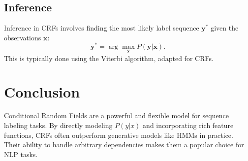 \begin{notechapter}
\subsection{Inference}
Inference in CRFs involves finding the most likely 
label sequence \( \mathbf{y}^* \) given the 
observations \( \mathbf{x} \):
\[
\mathbf{y}^* = \arg\max_{\mathbf{y}} P(\mathbf{y} | \mathbf{x}).
\]
This is typically done using the Viterbi algorithm, 
adapted for CRFs.

\section{Conclusion}
Conditional Random Fields are a powerful and flexible 
model for sequence labeling tasks. By directly modeling 
\( P(y | x) \) and incorporating rich feature functions, 
CRFs often outperform generative models like HMMs in 
practice. Their ability to handle arbitrary dependencies 
makes them a popular choice for NLP tasks.
\end{notechapter}

